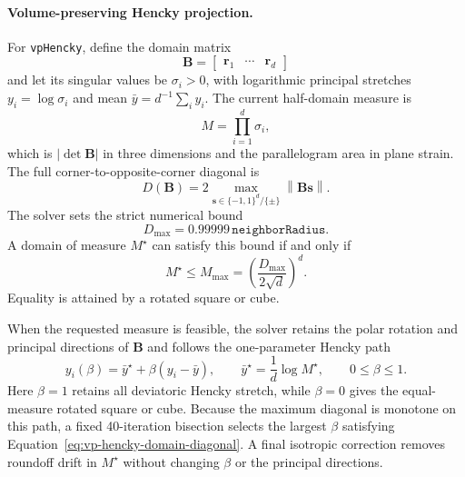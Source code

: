 \paragraph{Volume-preserving Hencky projection.}
For \texttt{vpHencky}, define the domain matrix
\begin{equation}
  \mathbf{B}=\begin{bmatrix}\boldsymbol{r}_1&\cdots&\boldsymbol{r}_d\end{bmatrix}
\end{equation}
and let its singular values be $\sigma_i>0$, with logarithmic principal stretches $y_i=\log\sigma_i$ and mean $\bar y=d^{-1}\sum_i y_i$.  The current half-domain measure is
\begin{equation}
  M=\prod_{i=1}^{d}\sigma_i,
\end{equation}
which is $|\det\mathbf{B}|$ in three dimensions and the parallelogram area in plane strain.  The full corner-to-opposite-corner diagonal is
\begin{equation}
  D(\mathbf{B})=2\max_{\boldsymbol{s}\in\{-1,1\}^{d}/\{\pm\}}
  \left\|\mathbf{B}\boldsymbol{s}\right\|.
  \label{eq:vp-hencky-domain-diagonal}
\end{equation}
The solver sets the strict numerical bound
\begin{equation}
  D_{\max}=0.99999\,\texttt{neighborRadius}.
\end{equation}
A domain of measure $M^{\star}$ can satisfy this bound if and only if
\begin{equation}
  M^{\star}\le M_{\max}
  =\left(\frac{D_{\max}}{2\sqrt{d}}\right)^d.
  \label{eq:vp-hencky-feasibility}
\end{equation}
Equality is attained by a rotated square or cube.

When the requested measure is feasible, the solver retains the polar rotation and principal directions of $\mathbf{B}$ and follows the one-parameter Hencky path
\begin{equation}
  y_i(\beta)=\bar y^{\star}+\beta(y_i-\bar y),
  \qquad
  \bar y^{\star}=\frac{1}{d}\log M^{\star},
  \qquad 0\le\beta\le1.
  \label{eq:vp-hencky-path}
\end{equation}
Here $\beta=1$ retains all deviatoric Hencky stretch, while $\beta=0$ gives the equal-measure rotated square or cube.  Because the maximum diagonal is monotone on this path, a fixed 40-iteration bisection selects the largest $\beta$ satisfying Equation~\eqref{eq:vp-hencky-domain-diagonal}.  A final isotropic correction removes roundoff drift in $M^{\star}$ without changing $\beta$ or the principal directions.

